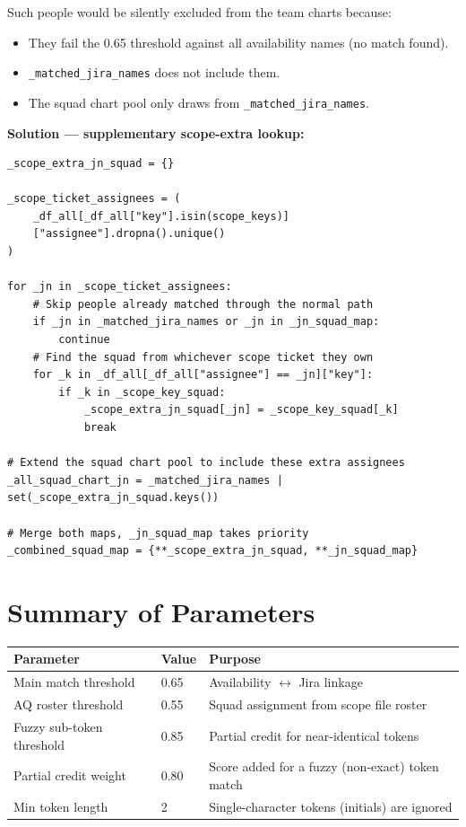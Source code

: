\documentclass[12pt, a4paper]{article}
\begin{document}
Such people would be silently excluded from the team charts because:
\begin{itemize}
    \item They fail the 0.65 threshold against all availability names (no match found).
    \item \texttt{\_matched\_jira\_names} does not include them.
    \item The squad chart pool only draws from \texttt{\_matched\_jira\_names}.
\end{itemize}

\textbf{Solution — supplementary scope-extra lookup:}

\begin{lstlisting}[style=python, caption={Supplementary lookup for non-availability scope owners}]
_scope_extra_jn_squad = {}

_scope_ticket_assignees = (
    _df_all[_df_all["key"].isin(scope_keys)]
    ["assignee"].dropna().unique()
)

for _jn in _scope_ticket_assignees:
    # Skip people already matched through the normal path
    if _jn in _matched_jira_names or _jn in _jn_squad_map:
        continue
    # Find the squad from whichever scope ticket they own
    for _k in _df_all[_df_all["assignee"] == _jn]["key"]:
        if _k in _scope_key_squad:
            _scope_extra_jn_squad[_jn] = _scope_key_squad[_k]
            break

# Extend the squad chart pool to include these extra assignees
_all_squad_chart_jn = _matched_jira_names | set(_scope_extra_jn_squad.keys())

# Merge both maps, _jn_squad_map takes priority
_combined_squad_map = {**_scope_extra_jn_squad, **_jn_squad_map}
\end{lstlisting}

\section{Summary of Parameters}

\begin{center}
\begin{tabular}{lll}
    \toprule
    \textbf{Parameter} & \textbf{Value} & \textbf{Purpose} \\
    \midrule
    Main match threshold       & 0.65 & Availability $\leftrightarrow$ Jira linkage \\
    AQ roster threshold        & 0.55 & Squad assignment from scope file roster \\
    Fuzzy sub-token threshold  & 0.85 & Partial credit for near-identical tokens \\
    Partial credit weight      & 0.80 & Score added for a fuzzy (non-exact) token match \\
    Min token length           & 2    & Single-character tokens (initials) are ignored \\
    \bottomrule
\end{tabular}
\end{center}
\end{document}
